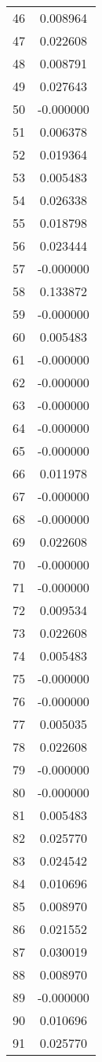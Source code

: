 \documentclass[12pt]{article}
\begin{document}
\begin{longtable}{@{}cc@{}}
46 & 0.008964 \\
47 & 0.022608 \\
48 & 0.008791 \\
49 & 0.027643 \\
50 & -0.000000 \\
51 & 0.006378 \\
52 & 0.019364 \\
53 & 0.005483 \\
54 & 0.026338 \\
55 & 0.018798 \\
56 & 0.023444 \\
57 & -0.000000 \\
58 & 0.133872 \\
59 & -0.000000 \\
60 & 0.005483 \\
61 & -0.000000 \\
62 & -0.000000 \\
63 & -0.000000 \\
64 & -0.000000 \\
65 & -0.000000 \\
66 & 0.011978 \\
67 & -0.000000 \\
68 & -0.000000 \\
69 & 0.022608 \\
70 & -0.000000 \\
71 & -0.000000 \\
72 & 0.009534 \\
73 & 0.022608 \\
74 & 0.005483 \\
75 & -0.000000 \\
76 & -0.000000 \\
77 & 0.005035 \\
78 & 0.022608 \\
79 & -0.000000 \\
80 & -0.000000 \\
81 & 0.005483 \\
82 & 0.025770 \\
83 & 0.024542 \\
84 & 0.010696 \\
85 & 0.008970 \\
86 & 0.021552 \\
87 & 0.030019 \\
88 & 0.008970 \\
89 & -0.000000 \\
90 & 0.010696 \\
91 & 0.025770 \\

\end{longtable}
\end{document}
